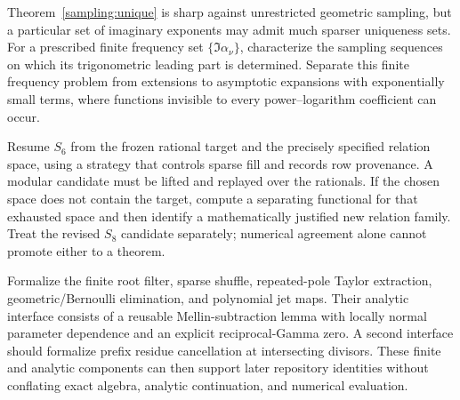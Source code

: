 \begin{question}
Theorem~\ref{sampling:unique} is sharp against unrestricted geometric
sampling, but a particular set of imaginary exponents may admit much
sparser uniqueness sets. For a prescribed finite frequency set
$\{\Im\alpha_\nu\}$, characterize the sampling sequences on which
its trigonometric leading part is determined. Separate this finite
frequency problem from extensions to asymptotic expansions with
exponentially small terms, where functions invisible to every
power--logarithm coefficient can occur.
\end{question}

\begin{question}
Resume $S_6$ from the frozen rational target and the precisely specified
relation space, using a strategy that controls sparse fill and records
row provenance. A modular candidate must be lifted and replayed over
the rationals. If the chosen space does not contain the target,
compute a separating functional for that exhausted space and then
identify a mathematically justified new relation family. Treat the
revised $S_8$ candidate separately; numerical agreement alone cannot
promote either to a theorem.
\end{question}

\begin{question}
Formalize the finite root filter, sparse shuffle, repeated-pole Taylor
extraction, geometric/Bernoulli elimination, and polynomial jet maps.
Their analytic interface consists of a reusable Mellin-subtraction
lemma with locally normal parameter dependence and an explicit
reciprocal-Gamma zero. A second interface should formalize prefix
residue cancellation at intersecting divisors. These finite and
analytic components can then support later repository identities
without conflating exact algebra, analytic continuation, and
numerical evaluation.
\end{question}
